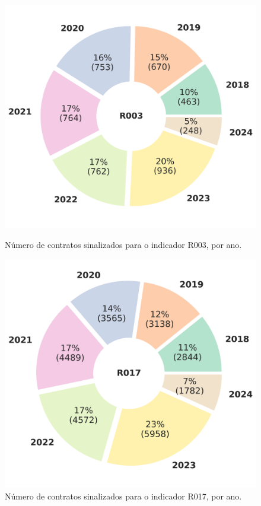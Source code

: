 \begin{figure}[H]
	\centering
	\begin{minipage}{.44\linewidth}
		\includegraphics[width=\linewidth]{imagens/final/circle_R003.png}
		\caption{Número de contratos sinalizados para o indicador R003, por ano.}
		\label{final2}
	\end{minipage}
	\hfill
	\begin{minipage}{.44\linewidth}
		\includegraphics[width=\linewidth]{imagens/final/circle_R017.png}
		\caption{Número de contratos sinalizados para o indicador R017, por ano.}
		\label{final3}
		
	\end{minipage}
\end{figure}




